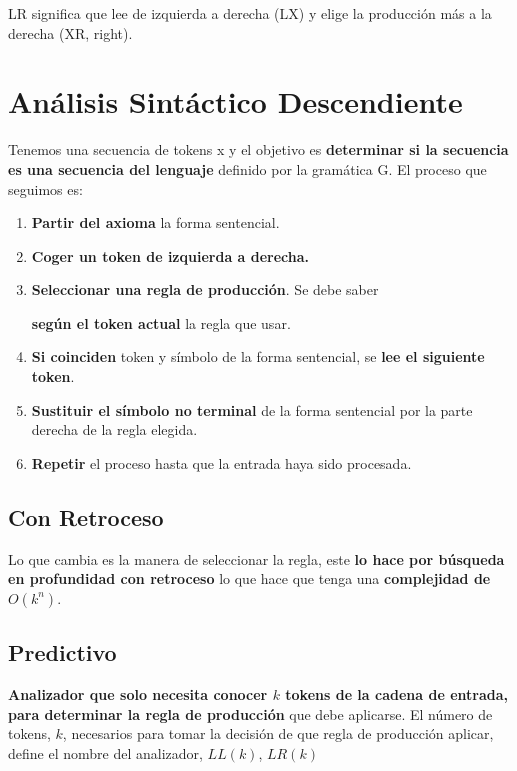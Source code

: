 \documentclass[12pt, twoside, openright]{report} %
\begin{document}
LR significa que lee de izquierda a derecha (LX) y elige la producción
más a la derecha (XR, right).

\section{Análisis Sintáctico Descendiente}

Tenemos una secuencia de tokens x y el objetivo es \textbf{determinar si
la secuencia es una secuencia del lenguaje} definido por la gramática G.
El proceso que seguimos es:

\begin{enumerate}
\def\labelenumi{\arabic{enumi}.}

\item
  \textbf{Partir del axioma} la forma sentencial.
\item
  \textbf{Coger un token de izquierda a derecha.}
\item
  \textbf{Seleccionar una regla de producción}. Se debe saber
  
  \textbf{según el token actual} la regla que usar.
\item
  \textbf{Si coinciden} token y símbolo de la forma sentencial, se
  \textbf{lee el siguiente token}.
\item
  \textbf{Sustituir el símbolo no terminal} de la forma sentencial por
  la parte derecha de la regla elegida.
\item
  \textbf{Repetir} el proceso hasta que la entrada haya sido procesada.
\end{enumerate}


\subsection{Con Retroceso}

Lo que cambia es la manera de seleccionar la regla, este \textbf{lo hace
por búsqueda en profundidad con retroceso} lo que hace que tenga una
\textbf{complejidad de \(O(k^n)\)}.


\subsection{Predictivo}

\textbf{Analizador que solo necesita conocer \(k\) tokens de la cadena
de entrada, para determinar la regla de producción} que debe aplicarse.
El número de tokens, \(k\), necesarios para tomar la decisión de que
regla de producción aplicar, define el nombre del analizador, \(LL(k)\),
\(LR(k)\)
\end{document}
